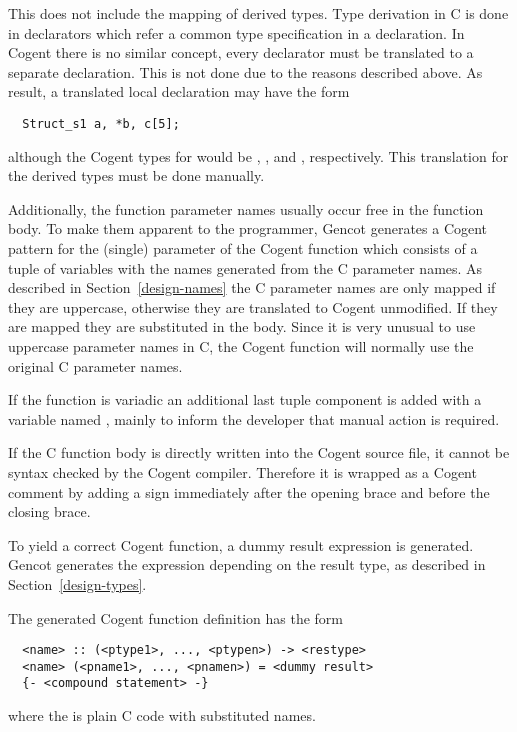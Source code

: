 This does not include the mapping of derived types. Type derivation in C is done in declarators which refer
a common type specification in a declaration. In Cogent there is no similar concept, every declarator must be 
translated to a separate declaration. This is not done due to the reasons described above. As result, a translated
local declaration may have the form
\begin{verbatim}
  Struct_s1 a, *b, c[5];
\end{verbatim}
although the Cogent types for  would be , , and 
, respectively. This translation for the derived types must be done manually.

Additionally, the function parameter names usually occur free in the function body. To make them apparent to
the programmer, Gencot generates a Cogent pattern for the (single) parameter of the Cogent function which 
consists of a tuple of variables with the names generated from the C parameter names. As described in 
Section~\ref{design-names} the C parameter names are only mapped if they are uppercase, otherwise they are
translated to Cogent unmodified. If they are mapped they are substituted in the body. Since it is very unusual
to use uppercase parameter names in C, the Cogent function will normally use the original C parameter names.

If the function is variadic an additional last tuple component is added with a variable named
, mainly to inform the developer that manual action is required.

If the C function body is directly written into the Cogent source file, it cannot be syntax checked by the 
Cogent compiler. Therefore it is wrapped as a Cogent comment by adding a \code{-} sign immediately after the
opening brace and before the closing brace.

To yield a correct Cogent function, a dummy result expression is generated. Gencot generates the expression
depending on the result type, as described in Section~\ref{design-types}. 

The generated Cogent function definition has the form
\begin{verbatim}
  <name> :: (<ptype1>, ..., <ptypen>) -> <restype>
  <name> (<pname1>, ..., <pnamen>) = <dummy result>
  {- <compound statement> -}
\end{verbatim}
where the  is plain C code with substituted names.

